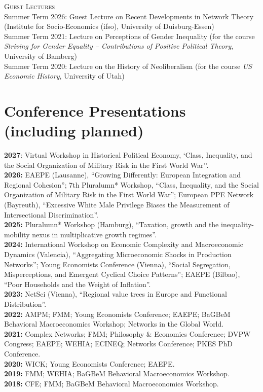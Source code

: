 \documentclass[margin]{res}
\begin{document}
\begin{resume}
	\newpage
	\textsc{Guest Lectures} \\ 
	Summer Term 2026: Guest Lecture on Recent Developments in Network Theory (Institute for Socio-Economics (ifso), University of Duisburg-Essen)\\

	Summer Term 2021: Lecture on Perceptions of Gender Inequality (for the course \textit{Striving for Gender Equality -- Contributions of Positive Political Theory}, University of Bamberg)\\
	
	Summer Term 2020: Lecture on the History of Neoliberalism (for the course \textit{US Economic History}, University of Utah)\\

	\section{Conference Presentations (including planned)}
	\textbf{2027}: Virtual Workshop in Historical Political Economy, `Class, Inequality, and the Social Organization of Military Risk in the First World War''.\\
	\textbf{2026:} EAEPE (Lausanne), ``Growing Differently: European Integration and Regional Cohesion''; 7th Pluralumn* Workshop, ``Class, Inequality, and the Social Organization of Military Risk in the First World War''; European PPE Network (Bayreuth), ``Excessive White Male Privilege Biases the Measurement of Intersectional Discrimination''.\\
	\textbf{2025:} Pluralumn* Workshop (Hamburg), ``Taxation, growth and the inequality-mobility nexus in multiplicative growth regimes''.\\
	\textbf{2024:} International Workshop on Economic Complexity and Macroeconomic Dynamics (Valencia), ``Aggregating Microeconomic Shocks in Production Networks''; Young Economists Conference (Vienna), ``Social Segregation, Misperceptions, and Emergent Cyclical Choice Patterns''; EAEPE (Bilbao), ``Poor Households and the Weight of Inflation''.\\
	\textbf{2023:} NetSci (Vienna), ``Regional value trees in Europe and Functional Distribution''.\\
	\textbf{2022:} AMPM; FMM; Young Economists Conference; EAEPE; BaGBeM Behavioral Macroeconomics Workshop; Networks in the Global World.\\
	\textbf{2021:} Complex Networks; FMM; Philosophy \& Economics Conference; DVPW Congress; EAEPE; WEHIA; ECINEQ; Networks Conference; PKES PhD Conference.\\
	\textbf{2020:} WICK; Young Economists Conference; EAEPE.\\
	\textbf{2019:} FMM; WEHIA; BaGBeM Behavioral Macroeconomics Workshop.\\
	\textbf{2018:} CFE; FMM; BaGBeM Behavioral Macroeconomics Workshop.\\
	

\end{resume}
\end{document}
